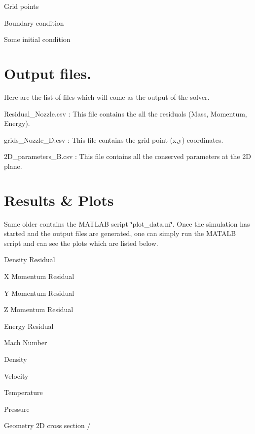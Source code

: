 \begin{DoxyItemize}
\item Grid points
\item Boundary condition
\item Some initial condition 
\end{DoxyItemize}\hypertarget{index_output}{}\section{Output files.}\label{index_output}
Here are the list of files which will come as the output of the solver.
\begin{DoxyItemize}
\item Residual\+\_\+\+Nozzle.\+csv \+: This file contains the all the residuals (Mass, Momentum, Energy).
\item grids\+\_\+\+Nozzle\+\_\+D.\+csv \+: This file contains the grid point (x,y) coordinates.
\item 2\+D\+\_\+parameters\+\_\+\+B.\+csv \+: This file contains all the conserved parameters at the 2D plane. 
\end{DoxyItemize}\hypertarget{index_plot}{}\section{Results \& Plots}\label{index_plot}
Same older contains the M\+A\+T\+L\+AB script \char`\"{}plot\+\_\+data.\+m\char`\"{}. Once the simulation has started and the output files are generated, one can simply run the M\+A\+T\+A\+LB script and can see the plots which are listed below.
\begin{DoxyItemize}
\item Density Residual
\item X Momentum Residual
\item Y Momentum Residual
\item Z Momentum Residual
\item Energy Residual
\item Mach Number
\item Density
\item Velocity
\item Temperature
\item Pressure
\item Geometry 2D cross section /  
\end{DoxyItemize}